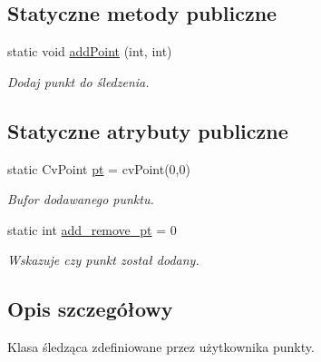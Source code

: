 \subsection*{Statyczne metody publiczne}
\begin{CompactItemize}
\item 
\hypertarget{class_points2_f00905a8a3803e51af17d1d3dbd7f33c}{
static void \hyperlink{class_points2_f00905a8a3803e51af17d1d3dbd7f33c}{addPoint} (int, int)}
\label{class_points2_f00905a8a3803e51af17d1d3dbd7f33c}

\begin{CompactList}\small\item\em Dodaj punkt do śledzenia. \item\end{CompactList}\end{CompactItemize}
\subsection*{Statyczne atrybuty publiczne}
\begin{CompactItemize}
\item 
\hypertarget{class_points2_47f061a9802f8541f71ff3c805bd457f}{
static CvPoint \hyperlink{class_points2_47f061a9802f8541f71ff3c805bd457f}{pt} = cvPoint(0,0)}
\label{class_points2_47f061a9802f8541f71ff3c805bd457f}

\begin{CompactList}\small\item\em Bufor dodawanego punktu. \item\end{CompactList}\item 
\hypertarget{class_points2_27c9b3b569a0ac996490da0c6721408a}{
static int \hyperlink{class_points2_27c9b3b569a0ac996490da0c6721408a}{add\_\-remove\_\-pt} = 0}
\label{class_points2_27c9b3b569a0ac996490da0c6721408a}

\begin{CompactList}\small\item\em Wskazuje czy punkt został dodany. \item\end{CompactList}\end{CompactItemize}


\subsection{Opis szczegółowy}
Klasa śledząca zdefiniowane przez użytkownika punkty. 

